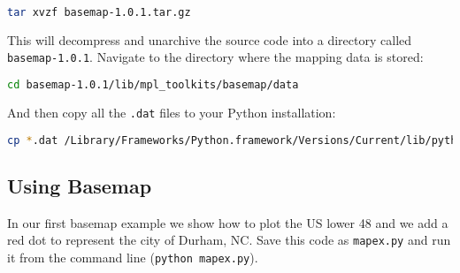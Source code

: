 \documentclass{article}
\begin{document}
\begin{lstlisting}[language=bash]
tar xvzf basemap-1.0.1.tar.gz
\end{lstlisting}
This will decompress and unarchive the source code into a directory
called \lstinline!basemap-1.0.1!. Navigate to the directory where the
mapping data is stored:

\begin{lstlisting}[language=bash]
cd basemap-1.0.1/lib/mpl_toolkits/basemap/data
\end{lstlisting}
And then copy all the \lstinline!.dat! files to your Python
installation:

\begin{lstlisting}[language=bash]
cp *.dat /Library/Frameworks/Python.framework/Versions/Current/lib/python2.7/site-packages/mpl_toolkits/basemap/data
\end{lstlisting}
\subsection{Using Basemap}

In our first basemap example we show how to plot the US lower 48 and we
add a red dot to represent the city of Durham, NC. Save this code as
\lstinline!mapex.py! and run it from the command line
(\lstinline!python mapex.py!).
\end{document}
